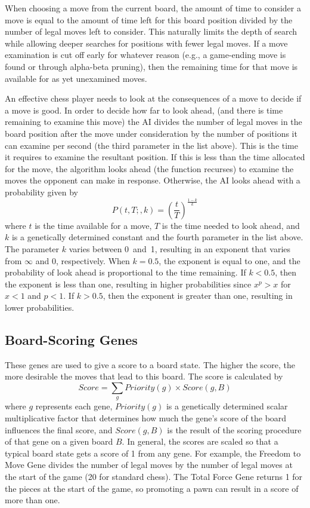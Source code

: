 \documentclass[letter]{article}
\renewcommand\_{\textunderscore\allowbreak}
\begin{document}
When choosing a move from the current board, the amount of time to consider a move is equal to the amount of time left for this board position divided by the number of legal moves left to consider. This naturally limits the depth of search while allowing deeper searches for positions with fewer legal moves. If a move examination is cut off early for whatever reason (e.g., a game-ending move is found or through alpha-beta pruning), then the remaining time for that move is available for as yet unexamined moves.

An effective chess player needs to look at the consequences of a move to decide if a move is good. In order to decide how far to look ahead, (and there is time remaining to examine this move) the AI divides the number of legal moves in the board position after the move under consideration by the number of positions it can examine per second (the third parameter in the list above). This is the time it requires to examine the resultant position. If this is less than the time allocated for the move, the algorithm looks ahead (the function recurses) to examine the moves the opponent can make in response. Otherwise, the AI looks ahead with a probability given by
$$P(t, T;, k) = \left(\frac{t}{T}\right)^\frac{1-k}{k}$$
where $t$ is the time available for a move, $T$ is the time needed to look ahead, and $k$ is a genetically determined constant and the fourth parameter in the list above. The parameter $k$ varies between 0~and~1, resulting in an exponent that varies from $\infty$ and $0$, respectively. When $k=0.5$, the exponent is equal to one, and the probability of look ahead is proportional to the time remaining. If $k < 0.5$, then the exponent is less than one, resulting in higher probabilities since $x^p > x$ for $x < 1$ and $p < 1$.  If $k > 0.5$, then the exponent is greater than one, resulting in lower probabilities.

\subsection{Board-Scoring Genes}
These genes are used to give a score to a board state. The higher the score, the more desirable the moves that lead to this board. The score is calculated by
$$Score = \sum_g Priority(g) \times Score(g,B)$$
where $g$ represents each gene, $Priority(g)$ is a genetically determined scalar multiplicative factor that determines how much the gene's score of the board influences the final score, and $Score(g,B)$ is the result of the scoring procedure of that gene on a given board $B$. In general, the scores are scaled so that a typical board state gets a score of 1 from any gene. For example, the Freedom to Move Gene divides the number of legal moves by the number of legal moves at the start of the game (20 for standard chess). The Total Force Gene returns 1 for the pieces at the start of the game, so promoting a pawn can result in a score of more than one.
\end{document}

